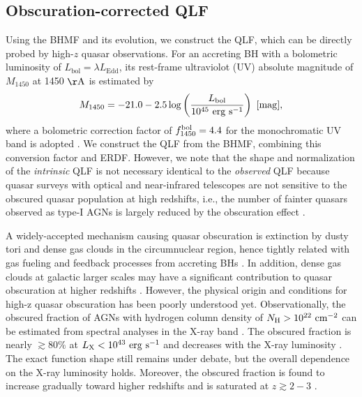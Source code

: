 \documentclass[twocolumn, twocolappendix]{aastex63}
\newcommand{\Muv}{M_{1450}}
\newcommand{\Lbol}{L_\mathrm{bol}}
\begin{document}
\begin{CJK*}{UTF8}{gbsn}
\vspace{2mm}
\subsection{Obscuration-corrected QLF}\label{sec:LF}

Using the BHMF and its evolution, we construct the QLF, which can be directly probed by high-$z$ quasar observations.
For an accreting BH with a bolometric luminosity of $\Lbol=\lambda L_\mathrm{Edd}$, 
its rest-frame ultraviolot (UV) absolute magnitude of $\Muv$ at 1450 $\mathrm{\AA}$ is estimated by
%
\begin{equation}
  \label{eq:M1450}
  \Muv= -21.0-2.5 \log  \left(\frac{\Lbol}{10^{45}~\mathrm{erg~s}^{-1}} \right) ~[\rm{mag}],
\end{equation}
%
where a bolometric correction factor of $f^{\rm bol}_{1450}=4.4$ for the monochromatic UV band is adopted
\citep{2006ApJS..166..470R}.
We construct the QLF from the BHMF, combining this conversion factor and ERDF.
However, we note that the shape and normalization of the {\it intrinsic} QLF is not necessary identical to the {\it observed} QLF
because quasar surveys with optical and near-infrared telescopes are not sensitive to the obscured quasar population at high redshifts,
i.e., the number of fainter quasars observed as type-I AGNs is largely reduced by the obscuration effect
\citep{2003ApJ...598..886U,2007A&A...463...79G,2008A&A...490..905H,2014ApJ...786..104U,2014MNRAS.437.3550M}. 


A widely-accepted mechanism causing quasar obscuration is extinction by dusty tori and dense gas clouds 
in the circumnuclear region, hence tightly related with gas fueling and feedback processes from accreting BHs 
\citep[see][for a review]{2018ARA&A..56..625H}.
In addition, dense gas clouds at galactic larger scales may have a significant contribution to quasar obscuration at 
higher redshifts \citep{2020MNRAS.495.2135N}.
However, the physical origin and conditions for high-z quasar obscuration has been poorly understood yet.
Observationally, the obscured fraction of AGNs with hydrogen column density of $N_{\rm H}>10^{22}~{\rm cm}^{-2}$
can be estimated from spectral analyses in the X-ray band
\citep[e.g.,][]{2003ApJ...598..886U,2007A&A...463...79G,2008A&A...490..905H}. 
The obscured fraction is nearly $\gtrsim 80\%$ at $L_{\rm X}<10^{43}~{\rm erg~s}^{-1}$ and 
decreases with the X-ray luminosity \citep{2014ApJ...786..104U,2014MNRAS.437.3550M}.
The exact function shape still remains under debate, but the overall dependence on the X-ray luminosity holds.
Moreover, the obscured fraction is found to increase gradually toward higher redshifts and is saturated at $z\gtrsim 2-3$
\citep{2008A&A...490..905H,2014ApJ...786..104U,2014MNRAS.437.3550M,2018MNRAS.473.2378V,2022arXiv220603508G}.



\end{CJK*}
\end{document}
